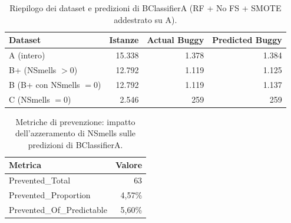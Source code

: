 \begin{table}[h]
\centering
\begin{tabular}{lrrr}
\toprule
\textbf{Dataset} & \textbf{Istanze} & \textbf{Actual Buggy} & \textbf{Predicted Buggy} \\
\midrule
A  (intero)              & 15.338 & 1.378 & 1.384 \\
B+ (NSmells $> 0$)       & 12.792 & 1.119 & 1.125 \\
B  (B+ con NSmells $= 0$) & 12.792 & 1.119 & 1.137 \\
C  (NSmells $= 0$)       &  2.546 &   259 &   259 \\
\bottomrule
\end{tabular}
\caption{Riepilogo dei dataset e predizioni di BClassifierA (RF + No FS + SMOTE addestrato su A).}
\label{tab:r3-datasets}
\end{table}

\begin{table}[h]
\centering
\begin{tabular}{lr}
\toprule
\textbf{Metrica} & \textbf{Valore} \\
\midrule
Prevented\_Total           &  63    \\
Prevented\_Proportion      &  4,57\% \\
Prevented\_Of\_Predictable &  5,60\% \\
\bottomrule
\end{tabular}
\caption{Metriche di prevenzione: impatto dell'azzeramento di NSmells sulle predizioni di BClassifierA.}
\label{tab:r3-prevention}
\end{table}

